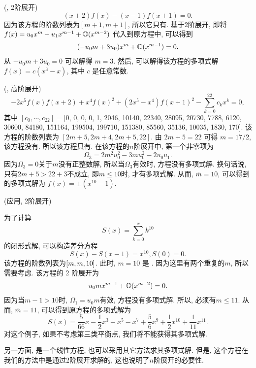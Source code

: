 \begin{example} \label{examp-3}
(\BPthree{}, 2阶展开)
\begin{equation}
(x+2)f(x)-(x-1)f(x+1)=0. \label{ep3}
\end{equation}
因为该方程的阶数列表为$[m+1,m+1]$, 所以它只有\BPthree{}. 基于2阶展开, 即将$f(x)=u_0 x^m + u_1 x^{m-1} + \mathbb O(x^{m-2})$ 代入到原方程中, 可以得到
\begin{equation}
(-u_0 m+3u_0)x^m+\mathbb O(x^{m-1})=0.
\end{equation}
从 $-u_0 m+3u_0=0$ 可以解得 $m=3$. 然后, 可以解得该方程的多项式解 $f(x)=c(x^3-x)$, 其中 $c$ 是任意常数. 
\end{example}

\begin{example}
(\BPthree{}, 高阶展开)
\begin{equation}
-2x^5f(x)f(x+2)+x^4f(x)^2+(2x^5-x^4)f(x+1)^2-\sum_{k=0}^{22}{c_k x^k}=0, \label{ep4}
\end{equation}
其中 $[c_0,\cdots,c_{22}]=$[0, 0, 0, 0, 1, 2046, 10140, 22340, 28095, 20730, 7788, 6120, 30600, 84180, 151164, 199504, 199710, 151380, 85560, 35136, 10035, 1830, 170]. 该方程的阶数列表为 $[2m+5,2m+4,2m+5,22]$. 由 $2m+5=22$ 可得 $ m=17/2$, 该方程没有\BPone{}. 所以该方程只有\BPthree{}. 在该方程的$n$阶展开中, 第一个非零项为 
\begin{equation}
\Omega_3 = 2m^2u_0^2-3mu_0^2-2u_0u_1.
\end{equation}
因为$\Omega_3=0$关于$m$没有正整数解, 所以当$\Omega_3$有效时, 方程没有多项式解. 换句话说, 只有$2m+5>22+3$不成立, 即$m\le 10$时, 才有多项式解. 从而, $\overline m =10$, 可以得到 的多项式解为 $f(x)=\pm (x^{10}-1)$.
\end{example}

\begin{example}
(应用, 2阶展开)

为了计算 
\begin{equation}
    S(x)=\sum_{k=0}^x{k^{10}}
\end{equation}
的闭形式解, 可以构造差分方程
\begin{equation}
    S(x)-S(x-1)=x^{10}, S(0)=0. \label{seq}
\end{equation}
该方程的阶数列表为$\left[m,m,10\right]$. 此时, $m=10$ 是 \BPone{}. 因为这里有两个重复的$m$, 所以需要考虑\BPthree{}. 该方程的 2 阶展开为
\begin{equation}
u_0m x^{m-1}+\mathbb O(x^{m-2})=0.   
\end{equation}
因为当$m-1>10$时, $\Omega_1=u_0m$有效, 方程没有多项式解. 所以, 必须有$m\le 11$. 从而, $\overline m=11$, 可以得到原方程的多项式解为
\begin{equation}
S(x)=\frac{5}{66}x-\frac{1}{2}x^3+x^5-x^7+\frac{5}{6}x^9+\frac{1}{2}x^{10}+\frac{1}{11}x^{11}.
\end{equation}
对这个例子, 如果不考虑第三类平衡点, 我们将不能获得其多项式解. 

另一方面, 是一个线性方程, 也可以采用其它方法\cite{Abramov1989polynomial,Abramov1995polynomial}求其多项式解. 但是, 这个方程在我们的方法中是通过2阶展开求解的, 这也说明了$n$阶展开的必要性. 
\end{example}

